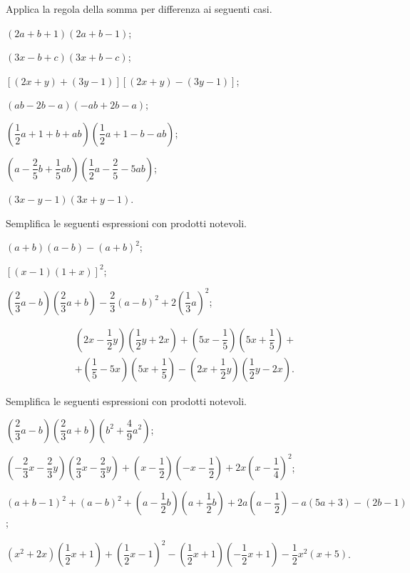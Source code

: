 \begin{esercizio}[\Ast]
 \label{ese:11.21}
Applica la regola della somma per differenza ai seguenti casi.

\begin{enumeratea}
\item $(2a+b+1)(2a+b-1)$;
\item $(3x-b+c)(3x+b-c)$;
\item $\left[(2x+y)+(3y-1)\right]\left[(2x+y)-(3y-1)\right]$;
\item $(ab-2b-a)(-{ab}+2b-a)$;
\item $\left(\dfrac{1}{2}a+1+b+ab\right)\left(\dfrac{1}{2}a+1-b-ab\right)$;
\item $\left(a-\dfrac{2}{5}b+\dfrac{1}{5}{ab}\right)\left(\dfrac{1}{2}a-\dfrac{2}{5}-5{ab}\right)$;
\item $(3x-y-1)(3x+y-1)$.
\end{enumeratea}
\end{esercizio}

\pagebreak
\begin{esercizio}[\Ast]
 \label{ese:11.22}
Semplifica le seguenti espressioni con prodotti notevoli.

 \begin{enumeratea}
 \item $(a+b)(a-b)-(a+b)^{2}$;
 \item $[(x-1)(1+x)]^{2}$;
 \item $\left(\dfrac{2}{3}a-b\right)\left(\dfrac{2}{3}a+b\right)-\dfrac{2}{3}(a-b)^{2}+2\left(\dfrac{1}{3}a\right)^{2}$;
 \item \begin{multline*}
 \left(2x-\dfrac{1}{2}y\right)\left(\dfrac{1}{2}y+2x\right)+\left(5x-\dfrac{1}{5}\right)\left(5x+\dfrac{1}{5}\right)+\\
 +\left(\dfrac{1}{5}-5x\right)\left(5x+\dfrac{1}{5}\right)-\left(2x+\dfrac{1}{2}y\right)\left(\dfrac{1}{2}y-2x\right).
	 \end{multline*}
 \end{enumeratea}
\end{esercizio}

\begin{esercizio}[\Ast]
 \label{ese:11.23}
Semplifica le seguenti espressioni con prodotti notevoli.

 \begin{enumeratea}
 \item $\left(\dfrac{2}{3}a-b\right)\left(\dfrac{2}{3}a+b\right)\left(b^{2}+\dfrac{4}{9}a^{2}\right)$;
 \item $\left(-{\dfrac{2}{3}x-\dfrac{2}{3}y}\right)\left(\dfrac{2}{3}x-\dfrac{2}{3}y\right)+\left(x-\dfrac{1}{2}\right)\left(-x-\dfrac{1}{2}\right)+2x\left(x-\dfrac{1}{4}\right)^{2}$;
 \item $(a+b-1)^{2}+(a-b)^{2}+\left(a-\dfrac{1}{2}b\right)\left(a+\dfrac{1}{2}b\right)+2a\left(a-\dfrac{1}{2}\right)-a(5a+3)-(2b-1)$;
 \item $\left(x^{2}+2x\right)\left(\dfrac{1}{2}x+1\right)+\left(\dfrac{1}{2}x-1\right)^{2}-\left(\dfrac{1}{2}x+1\right)\left(-{\dfrac{1}{2}}x+1\right)-\dfrac{1}{2}x^{2}(x+5)$.
\end{enumeratea}
\end{esercizio}

